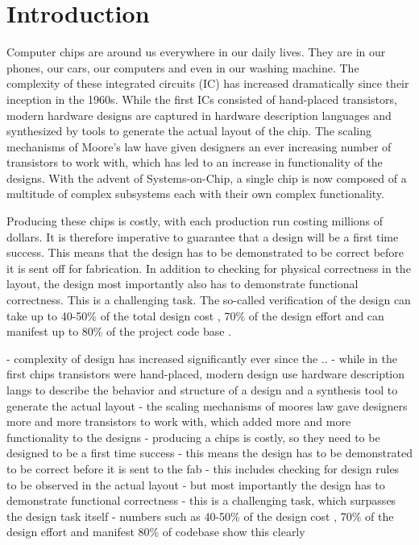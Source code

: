 \chapter{Introduction} %

Computer chips are around us everywhere in our daily lives. They are in our phones, our cars, our computers and even in our washing machine. The complexity of these integrated circuits (IC) has increased dramatically since their inception in the 1960s. While the first ICs consisted of hand-placed transistors, modern hardware designs are captured in hardware description languages and synthesized by tools to generate the actual layout of the chip. The scaling mechanisms of Moore's law have given designers an ever increasing number of transistors to work with, which has led to an increase in functionality of the designs. With the advent of Systems-on-Chip, a single chip is now composed of a multitude of complex subsystems each with their own complex functionality. 

Producing these chips is costly, with each production run costing millions of dollars. It is therefore imperative to guarantee that a design will be a first time success. This means that the design has to be demonstrated to be correct before it is sent off for fabrication. In addition to checking for physical correctness in the layout, the design most importantly also has to demonstrate functional correctness. This is a challenging task. The so-called verification of the design can take up to 40-50\% of the total design cost \cite{mehta2018asic}, 70\% of the design effort \cite{bergeron2012writing} and can manifest up to 80\% of the project code base \cite{bergeron2012writing}.




- complexity of design has increased significantly ever since the ..
- while in the first chips transistors were hand-placed, modern design use hardware description langs to describe the behavior and structure of a design and a synthesis tool to generate the actual layout
- the scaling mechanisms of moores law gave designers more and more transistors to work with, which added more and more functionality to the designs
- producing a chips is costly, so they need to be designed to be a first time success
- this means the design has to be demonstrated to be correct before it is sent to the fab
- this includes checking for design rules to be observed in the actual layout
- but most importantly the design has to demonstrate functional correctness
- this is a challenging task, which surpasses the design task itself
- numbers such as 40-50\% of the design cost \cite{mehta2018asic}, 70\% of the design effort and manifest 80\% of codebase \cite[Ch. 1]{bergeron2012writing} show this clearly


